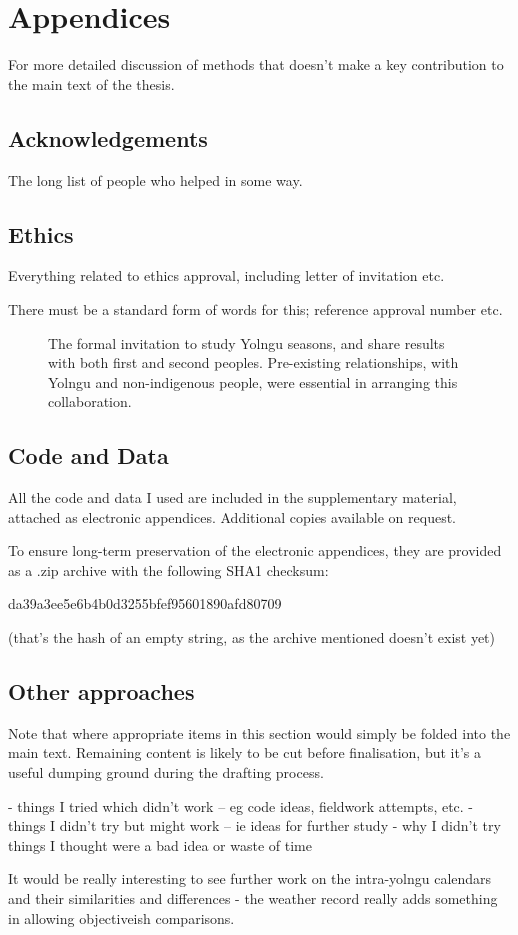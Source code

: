 \chapter{Appendices}
For more detailed discussion of methods that doesn't make a key contribution to the main text of the thesis.

\section{Acknowledgements}
The long list of people who helped in some way.


\section{Ethics} \label{sec:ethics}
Everything related to ethics approval, including letter of invitation etc.

There must be a standard form of words for this; reference approval number etc.

\begin{figure}[p]
    \centering
    \caption[Letter of invitation for collaborative research]{
        The formal invitation to study Yolngu seasons,
        and share results with both first and second peoples.
        Pre-existing relationships, with Yolngu and non-indigenous people,
        were essential in arranging this collaboration.
        }
    \label{app:invitation-letter}
\end{figure}


\section{Code and Data}
All the code and data I used are included in the supplementary material,
attached as electronic appendices.  Additional copies available on request.

To ensure long-term preservation of the electronic appendices, they
are provided as a .zip archive with the following SHA1 checksum:

da39a3ee5e6b4b0d3255bfef95601890afd80709

(that's the hash of an empty string, as the archive mentioned doesn't exist yet)



\section{Other approaches}
Note that where appropriate items in this section would simply be folded into the main text.
Remaining content is likely to be cut before finalisation,
but it's a useful dumping ground during the drafting process.

-	things I tried which didn't work – eg code ideas, fieldwork attempts, etc.
-	things I didn't try but might work – ie ideas for further study
-	why I didn't try things I thought were a bad idea or waste of time

It would be really interesting to see further work on the intra-yolngu calendars and their similarities and differences - the weather record really adds something in allowing objectiveish comparisons.


